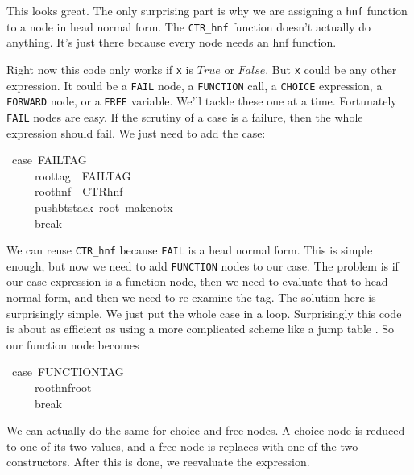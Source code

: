 \documentclass{book}
\theoremstyle{definition}
\newcommand{\Conid}[1]{\mathit{#1}}
\begin{document}
{This looks great.
The only surprising part is why we are assigning a \texttt{hnf} function to a
node in head normal form.
The \texttt{CTR\_hnf} function doesn't actually do anything.
It's just there because every node needs an hnf function.

Right now this code only works if \texttt x is \ensuremath{\Conid{True}} or \ensuremath{\Conid{False}}.
But \texttt x could be any other expression.
It could be a \texttt{FAIL} node, a \texttt{FUNCTION} call,
a \texttt{CHOICE} expression, a \texttt{FORWARD} node, or a \texttt{FREE} variable.
We'll tackle these one at a time.
Fortunately \texttt{FAIL} nodes are easy.  If the scrutiny of a case is a failure,
then the whole expression should fail.
We just need to add the case:

\begin{tabbing}\ttfamily
~case~FAILTAG\\
\ttfamily ~~~~~roottag~~FAILTAG\\
\ttfamily ~~~~~roothnf~~CTRhnf\\
\ttfamily ~~~~~pushbtstack~root~makenotx\\
\ttfamily ~~~~~break
\end{tabbing}

We can reuse \texttt{CTR\_hnf} because \texttt{FAIL} is a head normal form.
This is simple enough, but now we need to add \texttt{FUNCTION} nodes to our case.
The problem is if our case expression is a function node, then we need to evaluate that
to head normal form, and then we need to re-examine the tag.
The solution here is surprisingly simple.
We just put the whole case in a loop.
Surprisingly this code is about as efficient as using a more complicated scheme like a jump table
 \cite{branchPerformance}.
So our function node becomes

\begin{tabbing}\ttfamily
~case~FUNCTIONTAG\\
\ttfamily ~~~~~roothnfroot\\
\ttfamily ~~~~~break
\end{tabbing}

We can actually do the same for choice and free nodes.
A choice node is reduced to one of its two values,
and a free node is replaces with one of the two constructors.
After this is done, we reevaluate the expression.

}
\end{document}
